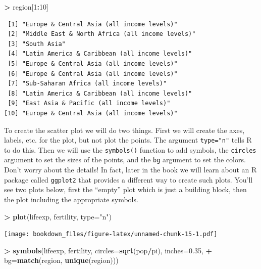 \documentclass[
]{krantz}
\makeatletter
\newenvironment{Shaded}{\begin{snugshade}}{\end{snugshade}}
\newcommand{\DataTypeTok}[1]{\textcolor[rgb]{0.27,0.27,0.27}{#1}}
\newcommand{\DecValTok}[1]{\textcolor[rgb]{0.06,0.06,0.06}{#1}}
\newcommand{\FloatTok}[1]{\textcolor[rgb]{0.06,0.06,0.06}{#1}}
\newcommand{\KeywordTok}[1]{\textcolor[rgb]{0.27,0.27,0.27}{\textbf{#1}}}
\newcommand{\NormalTok}[1]{#1}
\newcommand{\OperatorTok}[1]{\textcolor[rgb]{0.43,0.43,0.43}{\textbf{#1}}}
\newcommand{\StringTok}[1]{\textcolor[rgb]{0.5,0.5,0.5}{#1}}
\newenvironment{kframe}{%
\medskip{}
\setlength{\fboxsep}{.8em}
 \def\at@end@of@kframe{}%
 \ifinner\ifhmode%
  \def\at@end@of@kframe{\end{minipage}}%
  \begin{minipage}{\columnwidth}%
 \fi\fi%
 \def\FrameCommand##1{\hskip\@totalleftmargin \hskip-\fboxsep
 \colorbox{shadecolor}{##1}\hskip-\fboxsep
     \hskip-\linewidth \hskip-\@totalleftmargin \hskip\columnwidth}%
 \MakeFramed {\advance\hsize-\width
   \@totalleftmargin\z@ \linewidth\hsize
   \@setminipage}}%
 {\par\unskip\endMakeFramed%
 \at@end@of@kframe}
\renewenvironment{Shaded}{\begin{kframe}}{\end{kframe}}
\makeatother
\begin{document}
\begin{Shaded}
\begin{Highlighting}[]
\OperatorTok{\textgreater{}}\StringTok{ }\NormalTok{region[}\DecValTok{1}\OperatorTok{:}\DecValTok{10}\NormalTok{]}
\end{Highlighting}
\end{Shaded}

\begin{verbatim}
 [1] "Europe & Central Asia (all income levels)"     
 [2] "Middle East & North Africa (all income levels)"
 [3] "South Asia"                                    
 [4] "Latin America & Caribbean (all income levels)" 
 [5] "Europe & Central Asia (all income levels)"     
 [6] "Europe & Central Asia (all income levels)"     
 [7] "Sub-Saharan Africa (all income levels)"        
 [8] "Latin America & Caribbean (all income levels)" 
 [9] "East Asia & Pacific (all income levels)"       
[10] "Europe & Central Asia (all income levels)"     
\end{verbatim}

To create the scatter plot we will do two things. First we will create the axes, labels, etc. for the plot, but not plot the points. The argument \texttt{type="n"} tells R to do this. Then we will use the \texttt{symbols()} function to add symbols, the \texttt{circles} argument to set the sizes of the points, and the \texttt{bg} argument to set the colors. Don't worry about the details! In fact, later in the book we will learn about an R package called
\texttt{ggplot2} that provides a different way to create such plots. You'll see two plots below, first the ``empty'' plot which is just a building block, then the plot including the appropriate symbols.

\begin{Shaded}
\begin{Highlighting}[]
\OperatorTok{\textgreater{}}\StringTok{ }\KeywordTok{plot}\NormalTok{(lifeexp, fertility, }\DataTypeTok{type=}\StringTok{"n"}\NormalTok{)}
\end{Highlighting}
\end{Shaded}

\texttt{[image: bookdown\_files/figure-latex/unnamed-chunk-15-1.pdf]}

\begin{Shaded}
\begin{Highlighting}[]
\OperatorTok{\textgreater{}}\StringTok{ }\KeywordTok{symbols}\NormalTok{(lifeexp, fertility, }\DataTypeTok{circles=}\KeywordTok{sqrt}\NormalTok{(pop}\OperatorTok{/}\NormalTok{pi), }\DataTypeTok{inches=}\FloatTok{0.35}\NormalTok{, }
\OperatorTok{+}\StringTok{         }\DataTypeTok{bg=}\KeywordTok{match}\NormalTok{(region, }\KeywordTok{unique}\NormalTok{(region)))}
\end{Highlighting}
\end{Shaded}
\end{document}
